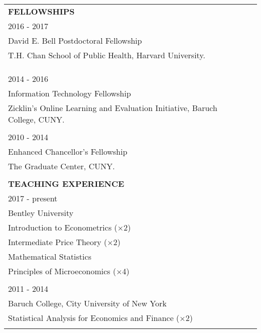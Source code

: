 \documentclass[12 pt]{article}
\begin{document}
\begin{longtable}{ccccc}
\\



 \multicolumn{5}{l}{\textbf{FELLOWSHIPS}}\\[2 pt] 
 \multicolumn{4}{l}{2016 - 2017} \\
 \multicolumn{4}{l}{David E. Bell Postdoctoral Fellowship} \\
\multicolumn{4}{l}{T.H. Chan School of Public Health, Harvard University.}   \\
\\
\\
\\
 \multicolumn{4}{l}{2014 - 2016} \\
 \multicolumn{4}{l}{Information Technology Fellowship} \\
\multicolumn{4}{l}{Zicklin's Online Learning and Evaluation Initiative, Baruch College, CUNY.}   \\
\\
 \multicolumn{4}{l}{2010 - 2014} \\
 \multicolumn{4}{l}{Enhanced Chancellor's Fellowship}  \\
\multicolumn{4}{l}{The Graduate Center, CUNY.}   \\

\\


 \multicolumn{5}{l}{\textbf{TEACHING EXPERIENCE}}\\[2 pt] 
  \multicolumn{4}{l}{2017 - present} \\
\multicolumn{4}{l}{Bentley University}   \\
 \multicolumn{4}{l}{Introduction to Econometrics ($\times$2)}      \\
  \multicolumn{4}{l}{Intermediate Price Theory ($\times$2)}    \\
 \multicolumn{4}{l}{Mathematical Statistics}      \\
\multicolumn{4}{l}{Principles of Microeconomics ($\times$4)} \\

\\
 \multicolumn{4}{l}{2011 - 2014} \\
\multicolumn{4}{l}{Baruch College, City University of New York}     \\

\multicolumn{4}{l}{Statistical Analysis for Economics and Finance ($\times$2)}        \\

\\


\end{longtable}
\end{document}

